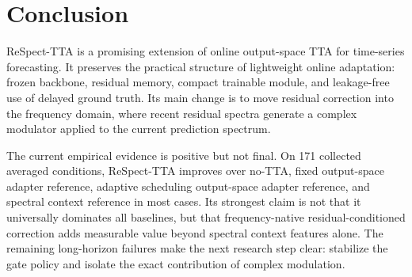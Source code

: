 \documentclass[10pt]{article}
\begin{document}
\section{Conclusion}

ReSpect-TTA is a promising extension of online output-space TTA for time-series forecasting. It preserves the practical structure of lightweight online adaptation: frozen backbone, residual memory, compact trainable module, and leakage-free use of delayed ground truth. Its main change is to move residual correction into the frequency domain, where recent residual spectra generate a complex modulator applied to the current prediction spectrum.

The current empirical evidence is positive but not final. On 171 collected averaged conditions, ReSpect-TTA improves over no-TTA, fixed output-space adapter reference, adaptive scheduling output-space adapter reference, and spectral context reference in most cases. Its strongest claim is not that it universally dominates all baselines, but that frequency-native residual-conditioned correction adds measurable value beyond spectral context features alone. The remaining long-horizon failures make the next research step clear: stabilize the gate policy and isolate the exact contribution of complex modulation.

\clearpage
\end{document}
